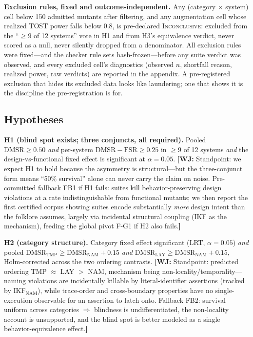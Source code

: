 \documentclass[conference]{IEEEtran}
\newcommand{\wj}[1]{{\color{blue}\footnotesize\textbf{[WJ:} #1\textbf{]}}}
\newcommand{\dmsr}{\mathrm{DMSR}}
\newcommand{\fsr}{\mathrm{FSR}}
\begin{document}
\textbf{Exclusion rules, fixed and outcome-independent.} Any (category $\times$ system) cell below 150 admitted mutants after filtering, and any augmentation cell whose realized TOST power falls below 0.8, is pre-declared \textsc{Inconclusive}: excluded from the ``$\geq 9$ of 12 systems'' vote in H1 and from H3's equivalence verdict, never scored as a null, never silently dropped from a denominator. All exclusion rules were fixed---and the checker rule sets hash-frozen---before any suite verdict was observed, and every excluded cell's diagnostics (observed $n$, shortfall reason, realized power, raw verdicts) are reported in the appendix. A pre-registered exclusion that hides its excluded data looks like laundering; one that shows it is the discipline the pre-registration is for.

\subsection{Hypotheses}\label{sec:hypotheses}

\textbf{H1 (blind spot exists; three conjuncts, all required).} Pooled $\dmsr \geq 0.50$ \emph{and} per-system $\dmsr - \fsr \geq 0.25$ in $\geq 9$ of 12 systems \emph{and} the design-vs-functional fixed effect is significant at $\alpha = 0.05$. \wj{Standpoint: we expect H1 to hold because the asymmetry is structural---but the three-conjunct form means ``50\% survival'' alone can never carry the claim on noise. Pre-committed fallback FB1 if H1 fails: suites kill behavior-preserving design violations at a rate indistinguishable from functional mutants; we then report the first certified corpus showing suites encode substantially \emph{more} design intent than the folklore assumes, largely via incidental structural coupling (IKF as the mechanism), feeding the global pivot F-G1 if H2 also fails.}

\textbf{H2 (category structure).} Category fixed effect significant (LRT, $\alpha = 0.05$) \emph{and} pooled $\dmsr_{\mathrm{TMP}} \geq \dmsr_{\mathrm{NAM}} + 0.15$ \emph{and} $\dmsr_{\mathrm{LAY}} \geq \dmsr_{\mathrm{NAM}} + 0.15$, Holm-corrected across the two ordering contrasts. \wj{Standpoint: predicted ordering TMP $\approx$ LAY $>$ NAM, mechanism being non-locality/temporality---naming violations are incidentally killable by literal-identifier assertions (tracked by IKF$_{\mathrm{NAM}}$), while trace-order and cross-boundary properties have no single-execution observable for an assertion to latch onto. Fallback FB2: survival uniform across categories $\Rightarrow$ blindness is undifferentiated, the non-locality account is unsupported, and the blind spot is better modeled as a single behavior-equivalence effect.}
\end{document}
